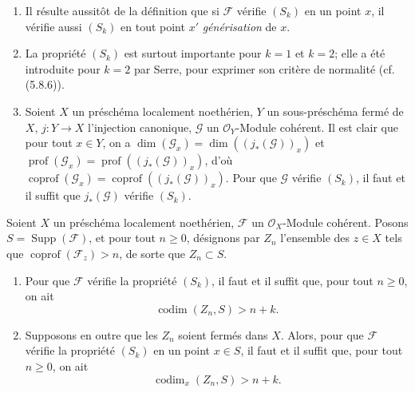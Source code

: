 \begin{remarks}[5.7.3]
\begin{enumerate}
\item[(iv)] Il résulte aussitôt de la définition que si $\mathscr F$ vérifie
$(S_k)$ en un point $x$, il vérifie aussi $(S_k)$ en tout point $x'$
\emph{générisation} de $x$.

\item[(v)] La propriété $(S_k)$ est surtout importante pour $k=1$ et
$k=2$; elle a été introduite pour $k=2$ par Serre, pour exprimer son critère
de normalité (cf. (5.8.6)).

\item[(vi)] Soient $X$ un préschéma localement noethérien, $Y$ un
sous-préschéma fermé de $X$, $j:Y\to X$ l'injection canonique, $\mathscr G$
un $\mathcal O_Y$-Module cohérent. Il est clair que pour tout $x\in Y$, on a
$\dim(\mathscr G_x)=\dim((j_*(\mathscr G))_x)$ et
$\operatorname{prof}(\mathscr G_x)=\operatorname{prof}((j_*(\mathscr G))_x)$,
d'où
$\operatorname{coprof}(\mathscr G_x)=\operatorname{coprof}((j_*(\mathscr G))_x)$.
Pour que $\mathscr G$ vérifie $(S_k)$, il faut et il suffit que
$j_*(\mathscr G)$ vérifie $(S_k)$.
\end{enumerate}
\end{remarks}

\begin{proposition}[5.7.4]
\label{IV.2.s5.7.4-fr}
Soient $X$ un préschéma localement noethérien, $\mathscr F$ un
$\mathcal O_X$-Module cohérent. Posons $S=\operatorname{Supp}(\mathscr F)$,
et pour tout $n\geq0$, désignons par $Z_n$ l'ensemble des $z\in X$ tels que
$\operatorname{coprof}(\mathscr F_z)>n$, de sorte que $Z_n\subset S$.
\begin{enumerate}
\item[\textup{(i)}] Pour que $\mathscr F$ vérifie la propriété $(S_k)$, il faut et il
suffit que, pour tout $n\geq0$, on ait
\begin{equation}
\operatorname{codim}(Z_n,S)>n+k.
\tag{5.7.4.1}\label{IV.2.s5.7.4.1-fr}
\end{equation}
\item[\textup{(ii)}] Supposons en outre que les $Z_n$ soient fermés dans $X$. Alors,
pour que $\mathscr F$ vérifie la propriété $(S_k)$ en un point $x\in S$, il
faut et il suffit que, pour tout $n\geq0$, on ait
\begin{equation}
\operatorname{codim}_x(Z_n,S)>n+k.
\tag{5.7.4.2}\label{IV.2.s5.7.4.2-fr}
\end{equation}
\end{enumerate}
\end{proposition}

